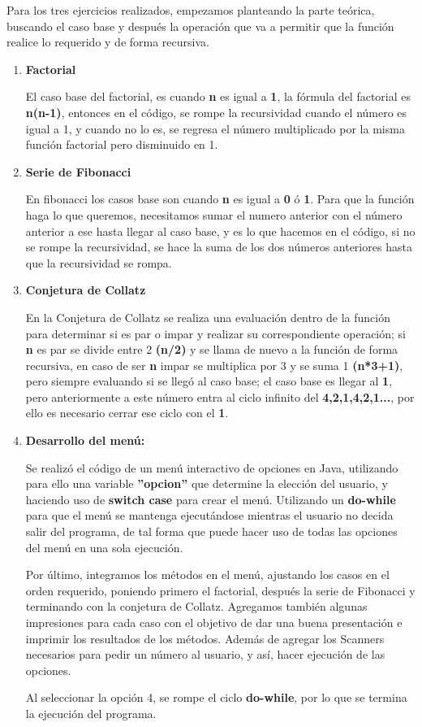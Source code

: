 \documentclass[letterpaper,12pt]{article}
\begin{document}
Para los tres ejercicios realizados, empezamos planteando la parte teórica, buscando el caso base y después la operación que va a permitir que la función realice lo requerido y de forma recursiva. 
\begin{enumerate}

    \item \textbf{Factorial}

    El caso base del factorial, es cuando \textbf{n} es igual a \textbf{1}, la fórmula del factorial es \textbf{n(n-1)}, entonces en el código, se rompe la recursividad cuando el número es igual a 1, y cuando no lo es, se regresa el número multiplicado por la misma función factorial pero disminuido en 1.

    \item \textbf{Serie de Fibonacci}

    En fibonacci los casos base son cuando \textbf{n} es igual a \textbf{0} ó \textbf{1}. Para que la función haga lo que queremos, necesitamos sumar el numero anterior con el número anterior a ese hasta llegar al caso base, y es lo que hacemos en el código, si no se rompe la recursividad, se hace la suma de los dos números anteriores hasta que la recursividad se rompa.  

    \item \textbf{Conjetura de Collatz}

    En la Conjetura de Collatz se realiza una evaluación dentro de la función para determinar si es par o impar y realizar su correspondiente operación; si \textbf{n} es par se divide entre 2 \textbf{(n/2)} y se llama de nuevo a la función de forma recursiva, en caso de ser \textbf{n} impar se multiplica por 3 y se suma 1 \textbf{(n*3+1)}, pero siempre evaluando si se llegó al caso base; el caso base es llegar al \textbf{1}, pero anteriormente a este número entra al ciclo infinito del \textbf{4,2,1,4,2,1...}, por ello es necesario cerrar ese ciclo con el \textbf{1}.

    \item \textbf {Desarrollo del menú:}
            
    Se realizó el código de un menú interactivo de opciones en Java, utilizando para ello una variable \textbf{''opcion''} que determine la elección del usuario, y haciendo uso de \textbf{switch case} para crear el menú. Utilizando un \textbf{do-while} para que el menú se mantenga ejecutándose mientras el usuario no decida salir del programa, de tal forma que puede hacer uso de todas las opciones del menú en una sola ejecución.
    
    Por último, integramos los métodos en el menú, ajustando los casos en el orden requerido, poniendo primero el factorial, después la serie de Fibonacci y terminando con la conjetura de Collatz. Agregamos también algunas impresiones para cada caso con el objetivo de dar una buena presentación e imprimir los resultados de los métodos. Además de agregar los Scanners necesarios para pedir un número al usuario, y así, hacer ejecución de las opciones.

    Al seleccionar la opción 4, se rompe el ciclo \textbf{do-while}, por lo que se termina la ejecución del programa.

    \end{enumerate}
\end{document}
